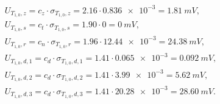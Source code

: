 \begin{gather}
U_{T_{1,0},z} = c_{z} \cdot \sigma_{T_{1,0},z} = 2.16 \cdot \num{0.836e-3} = \qty{1.81}{mV} \label{eq:sym_partd_output_unc_roun_T_1_0},\\
U_{T_{1,0},s} = c_{t} \cdot \sigma_{T_{1,0},s} = 1.90 \cdot \num{0} = \qty{0}{mV} \label{eq:sym_partd_output_unc_stat_T_1_0}, \\
U_{T_{1,0},r} = c_{n} \cdot \sigma_{T_{1,0},r} = 1.96 \cdot \num{12.44e-3} = \qty{24.38}{mV} \label{eq:sym_partd_output_unc_rand_T_1_0}, \\
U_{T_{1,0},d,1} = c_{d} \cdot \sigma_{T_{1,0},d,1} = 1.41 \cdot \num{0.065e-3} = \qty{0.092}{mV} \label{eq:sym_partd_output_unc_dyn_1_T_1_0}, \\
U_{T_{1,0},d,2} = c_{d} \cdot \sigma_{T_{1,0},d,2} = 1.41 \cdot \num{3.99e-3} = \qty{5.62}{mV} \label{eq:sym_partd_output_unc_dyn_2_T_1_0}, \\
U_{T_{1,0},d,3} = c_{d} \cdot \sigma_{T_{1,0},d,3} = 1.41 \cdot \num{20.28e-3} = \qty{28.60}{mV} \label{eq:sym_partd_output_unc_dyn_3_T_1_0}.
\end{gather}


